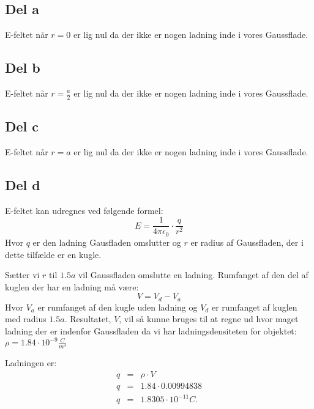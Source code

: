 \subsection{Del a} %
\label{sub:del_a}
E-feltet når $r = 0$ er lig nul da der ikke er nogen ladning inde i vores Gaussflade.

\subsection{Del b} %
\label{sub:del_b}
E-feltet når $r = \frac{a}{2}$ er lig nul da der ikke er nogen ladning inde i vores Gaussflade.

\subsection{Del c} %
\label{sub:del_c}
E-feltet når $r = a$ er lig nul da der ikke er nogen ladning inde i vores Gaussflade.

\subsection{Del d} %
\label{sub:del_d}
E-feltet kan udregnes ved følgende formel:
\begin{equation}
	E = \frac{1}{4\pi \epsilon _0} \cdot \frac{q}{r^2}
\end{equation}
Hvor $q$ er den ladning Gausfladen omslutter og $r$ er radius af Gaussfladen, der i dette tilfælde er en kugle.

Sætter vi $r$ til $1.5a$ vil Gaussfladen omslutte en ladning. Rumfanget af den del af kuglen der har en ladning må være:
\begin{equation}
	V = V_d - V_a
\end{equation}
Hvor $V_a$ er rumfanget af den kugle uden ladning og $V_d$ er rumfanget af kuglen med radius $1.5a$. Resultatet, $V$, vil så kunne bruges til at regne ud hvor maget ladning der er indenfor Gaussfladen da vi har ladningsdensiteten for objektet: $\rho = 1.84 \cdot 10^{-9}\frac{C}{m^3}$

Ladningen er:
\begin{eqnarray}
	q &=& \rho \cdot V \\
	q &=& 1.84 \cdot 0.00994838 \\
	q &=& 1.8305 \cdot 10^{-11} C. 
\end{eqnarray}

